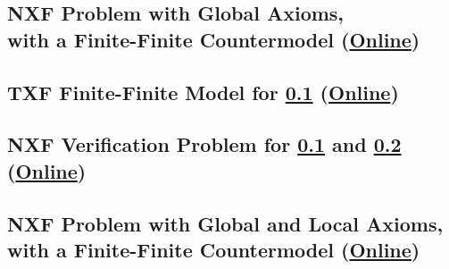\documentclass{easychair}
\begin{document}
\subsection{NXF Problem with Global Axioms, \\ with a Finite-Finite Countermodel
(\href{https://raw.githubusercontent.com/GeoffsPapers/InterpretationFormat/master/Examples/NXF_Finite-Finite-Global.p}{Online})}
\label{NXF_Finite-Finite-Global.p}
\begin{small}

\end{small}

\newpage
\subsection{TXF Finite-Finite Model for \ref{NXF_Finite-Finite-Global.p}
(\href{https://raw.githubusercontent.com/GeoffsPapers/InterpretationFormat/master/Examples/NXF_Finite-Finite-Global.s}{Online})}
\label{NXF_Finite-Finite-Global.s}
\begin{small}

\end{small}

\newpage
\subsection{NXF Verification Problem for \ref{NXF_Finite-Finite-Global.p} and 
\ref{NXF_Finite-Finite-Global.s}
(\href{https://raw.githubusercontent.com/GeoffsPapers/InterpretationFormat/master/Examples/NXF_Finite-Finite-Global.s.p}{Online})}
\label{NXF_Finite-Finite-Global.s.p}
\begin{small}

\end{small}

% 

\newpage
\subsection{NXF Problem with Global and Local Axioms, \\
            with a Finite-Finite Countermodel
(\href{https://raw.githubusercontent.com/GeoffsPapers/InterpretationFormat/master/Examples/NXF_Finite-Finite-Local.p}{Online})}
\label{NXF_Finite-Finite-Local.p}
\begin{small}

\end{small}
\end{document}
